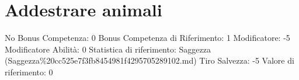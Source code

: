 \section{Addestrare animali}\label{addestrare-animali}

\begin{description}
\tightlist
\item[Tags: ABI]
No Bonus Competenza: 0 Bonus Competenza di Riferimento: 1 Modificatore:
-5 Modificatore Abilità: 0 Statistica di riferimento: Saggezza
(Saggezza\%20cc525e7f3fb8454981f4295705289102.md) Tiro Salvezza: -5
Valore di riferimento: 0
\end{description}
